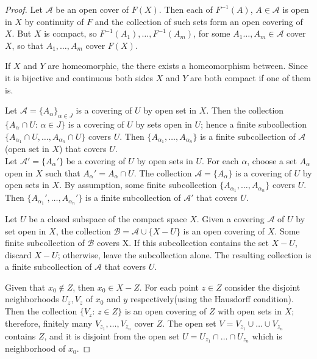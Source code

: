 \documentclass[11pt,a4paper]{article}
\begin{document}
\begin{proof}
 Let $\mathcal{A}$ be an open cover of $F(X)$. Then each of $F^{-1}(A)$, $A\in \mathcal{A}$ is open in $X$ by continuity of $F$ and the collection of such sets form an open covering of $X$. But $X$ is compact, so $F^{-1}(A_1),\ldots,F^{-1}(A_m)$, for some  $A_1\ldots,A_m\in \mathcal{A}$ cover $X$, so that $A_1,\ldots,A_m$ cover $F(X)$. 

 If $X$ and $Y$ are homeomorphic, the there exists a homeomorphism between. Since it is bijective and continuous both sides $X$ and $Y$ are both compact if one of them is.

 \forward Let $\mathcal{A} = \{A_\alpha\}_{\alpha\in J}$ is a covering of $U$ by open set in $X$. Then the collection $\{A_\alpha\cap U:\,\alpha\in J\}$ is a covering of $U$ by sets open in $U$; hence a finite subcollection $\{A_{\alpha_1}\cap U,\ldots,A_{\alpha_n}\cap U\}$ covers $U$. Then $\{A_{\alpha_1},\ldots,A_{\alpha_n}\}$ is a finite subcollection of $\mathcal{A}$(open set in $X$) that covers $U$.
\\
\converse Let $\mathcal{A}' = \{A_\alpha'\}$ be a covering of $U$ by open sets in $U$. For each $\alpha$, choose a set $A_\alpha$ open in $X$ such that $A_\alpha' = A_\alpha\cap U$. The collection $\mathcal{A} = \{A_\alpha\}$ is a covering of $U$ by open sets in $X$. By assumption, some finite subcollection $\{A_{\alpha_1},\ldots,A_{\alpha_n}\}$ covers $U$. Then $\{A_{\alpha_1}',\ldots,A_{\alpha_n}'\}$ is a finite subcollection of $\mathcal{A}'$ that covers $U$.

 Let $U$ be a closed subspace of the compact space $X$. Given a covering $\mathcal{A}$ of $U$ by set open in $X$, the collection $\mathcal{B} = \mathcal{A}\cup \{X-U\}$ is an open covering of $X$. Some finite subcollection of $\mathcal{B}$ covers X. If this subcollection contains the set $X-U$, discard $X-U$; otherwise, leave the subcollection alone. The resulting collection is a finite subcollection of $\mathcal{A}$ that covers $U$.

 Given that $x_0\notin Z$, then $x_0\in X-Z$. For each point $z\in Z$ consider the disjoint neighborhoods $U_z,V_z$ of $x_0$ and $y$ respectively(using the Hausdorff condition). Then the collection $\{V_z:\,z\in Z\}$ is an open covering of $Z$ with open sets in $X$; therefore, finitely many $V_{z_1},\ldots,V_{z_n}$ cover $Z$. The open set $V = V_{z_1}\cup \ldots \cup V_{z_n}$ contains $Z$, and it is disjoint from the open set $U = U_{z_1}\cap\ldots\cap U_{z_n}$ which is neighborhood of $x_0$.


\end{proof}
\end{document}
